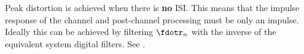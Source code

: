 Peak distortion is achieved when there is {\bf no} ISI.
This means that the impulse response of the channel and post-channel processing
must be only an impulse.
Ideally this can be achieved by filtering $\fdotr_n$ with the inverse of the
equivalent system digital filters.
See .


